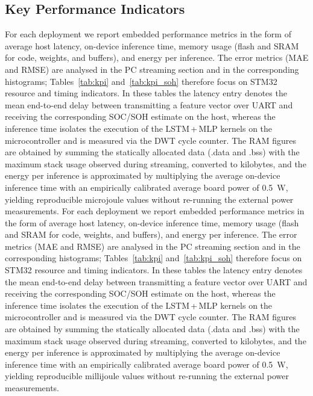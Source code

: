 \documentclass[final,3p,times]{elsarticle}
\begin{document}
\subsection{Key Performance Indicators}
For each deployment we report embedded performance metrics in the form of average host latency, on-device inference time, memory usage (flash and SRAM for code, weights, and buffers), and energy per inference. The error metrics (MAE and RMSE) are analysed in the PC streaming section and in the corresponding histograms; Tables~\ref{tab:kpi} and~\ref{tab:kpi_soh} therefore focus on STM32 resource and timing indicators. In these tables the latency entry denotes the mean end-to-end delay between transmitting a feature vector over UART and receiving the corresponding SOC/SOH estimate on the host, whereas the inference time isolates the execution of the LSTM\,+\,MLP kernels on the microcontroller and is measured via the DWT cycle counter. The RAM figures are obtained by summing the statically allocated data (.data and .bss) with the maximum stack usage observed during streaming, converted to kilobytes, and the energy per inference is approximated by multiplying the average on-device inference time with an empirically calibrated average board power of \SI{0.5}{\watt}, yielding reproducible microjoule values without re-running the external power measurements.
For each deployment we report embedded performance metrics in the form of average host latency, on-device inference time, memory usage (flash and SRAM for code, weights, and buffers), and energy per inference. The error metrics (MAE and RMSE) are analysed in the PC streaming section and in the corresponding histograms; Tables~\ref{tab:kpi} and~\ref{tab:kpi_soh} therefore focus on STM32 resource and timing indicators. In these tables the latency entry denotes the mean end-to-end delay between transmitting a feature vector over UART and receiving the corresponding SOC/SOH estimate on the host, whereas the inference time isolates the execution of the LSTM\,+\,MLP kernels on the microcontroller and is measured via the DWT cycle counter. The RAM figures are obtained by summing the statically allocated data (.data and .bss) with the maximum stack usage observed during streaming, converted to kilobytes, and the energy per inference is approximated by multiplying the average on-device inference time with an empirically calibrated average board power of \SI{0.5}{\watt}, yielding reproducible millijoule values without re-running the external power measurements.
\end{document}
